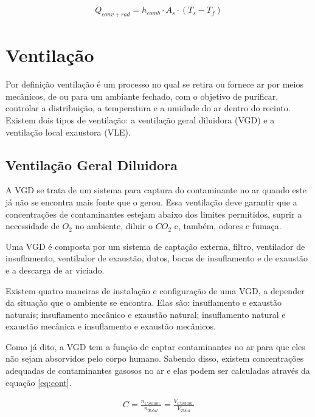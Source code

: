 \documentclass[acronym,symbols]{fei}
\begin{document}
\begin{equation} \label{eq:Combinado}
\begin{aligned}
    \dot{Q}_{conv+rad}=h_{comb} \cdot A_{s} \cdot (T_{s}-T_{f})
\end{aligned}
\end{equation}

\section{Ventilação} \label{ventilação}

Por definição ventilação é um processo no qual se retira ou fornece ar por meios mecânicos, de ou para um ambiante fechado, com o objetivo de purificar, controlar a distribuição, a temperatura e a umidade do ar dentro do recinto. %
Existem dois tipos de ventilação: a ventilação geral diluidora (VGD) e a ventilação local exaustora (VLE). 

\subsection{Ventilação Geral Diluidora} \label{VGD}
A VGD se trata de um sistema para captura do contaminante no ar quando este já não se encontra mais fonte que o gerou. Essa ventilação deve garantir que a concentrações de contaminantes estejam abaixo dos limites permitidos, suprir a necessidade de $O_2$ no ambiente, diluir o $CO_2$ e, também, odores e fumaça.

Uma VGD é composta por um sistema de captação externa, filtro, ventilador de insuflamento, ventilador de exaustão, dutos, bocas de insuflamento e de exaustão e a descarga de ar viciado.

Existem quatro maneiras de instalação e configuração de uma VGD, a depender da situação que o ambiente se encontra. Elas são: insuflamento e exaustão naturais; insuflamento mecânico e exaustão natural; insuflamento natural e exaustão mecânica e insuflamento e exaustão mecânicos.

Como já dito, a VGD tem a função de captar contaminantes no ar para que eles não sejam absorvidos pelo corpo humano. Sabendo disso, existem concentrações adequadas de contaminantes gasosos no ar e elas podem ser calculadas através da equação \ref{eq:cont}.

\begin{equation} \label{eq:cont}
\begin{aligned}
    C=\frac{n_{Contam.}}{n_{Total}}=\frac{V_{Contam.}}{V_{Total}}
\end{aligned}
\end{equation}
\end{document}
